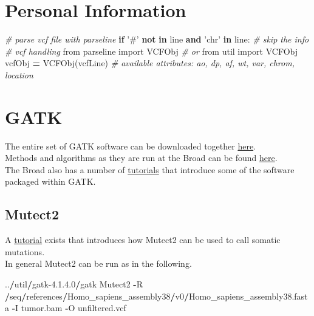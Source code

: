 \documentclass[]{book}
\newenvironment{Shaded}{\begin{snugshade}}{\end{snugshade}}
\newcommand{\CommentTok}[1]{\textcolor[rgb]{0.56,0.35,0.01}{\textit{#1}}}
\newcommand{\ControlFlowTok}[1]{\textcolor[rgb]{0.13,0.29,0.53}{\textbf{#1}}}
\newcommand{\DecValTok}[1]{\textcolor[rgb]{0.00,0.00,0.81}{#1}}
\newcommand{\FloatTok}[1]{\textcolor[rgb]{0.00,0.00,0.81}{#1}}
\newcommand{\ImportTok}[1]{#1}
\newcommand{\KeywordTok}[1]{\textcolor[rgb]{0.13,0.29,0.53}{\textbf{#1}}}
\newcommand{\NormalTok}[1]{#1}
\newcommand{\OperatorTok}[1]{\textcolor[rgb]{0.81,0.36,0.00}{\textbf{#1}}}
\newcommand{\StringTok}[1]{\textcolor[rgb]{0.31,0.60,0.02}{#1}}
\begin{document}
\hypertarget{personal-information}{%
\section{Personal Information}\label{personal-information}}

\begin{Shaded}
\begin{Highlighting}[]
\CommentTok{# parse vcf file with parseline}
\ControlFlowTok{if} \StringTok{'#'} \KeywordTok{not} \KeywordTok{in}\NormalTok{ line }\KeywordTok{and} \StringTok{'chr'} \KeywordTok{in}\NormalTok{ line: }\CommentTok{# skip the info}
\CommentTok{# vcf handling}
\ImportTok{from}\NormalTok{ parseline }\ImportTok{import}\NormalTok{ VCFObj}
\CommentTok{# or}
\ImportTok{from}\NormalTok{ util }\ImportTok{import}\NormalTok{ VCFObj}
\NormalTok{vcfObj }\OperatorTok{=}\NormalTok{ VCFObj(vcfLine)}
\CommentTok{# available attributes: ao, dp, af, wt, var, chrom, location}
\end{Highlighting}
\end{Shaded}

\hypertarget{gatk}{%
\section{GATK}\label{gatk}}

The entire set of GATK software can be downloaded together \href{'https://software.broadinstitute.org/gatk/'}{here}.\\
Methods and algorithms as they are run at the Broad can be found \href{'https://software.broadinstitute.org/gatk/documentation/topic?name=methods'}{here}.\\
The Broad also has a number of \href{'https://software.broadinstitute.org/gatk/documentation/topic?name=tutorials'}{tutorials} that introduce some of the software packaged within GATK.

\hypertarget{mutect2}{%
\subsection{Mutect2}\label{mutect2}}

A \href{'https://software.broadinstitute.org/gatk/documentation/article?id=24057'}{tutorial} exists that introduces how Mutect2 can be used to call somatic mutations.\\
In general Mutect2 can be run as in the following.

\begin{Shaded}
\begin{Highlighting}[]
\NormalTok{..}\OperatorTok{/}\NormalTok{util}\OperatorTok{/}\NormalTok{gatk}\DecValTok{-4}\NormalTok{.}\DecValTok{1}\NormalTok{.}\FloatTok{4.0}\OperatorTok{/}\NormalTok{gatk Mutect2 }\OperatorTok{-}\NormalTok{R }\OperatorTok{/}\NormalTok{seq}\OperatorTok{/}\NormalTok{references}\OperatorTok{/}\NormalTok{Homo_sapiens_assembly38}\OperatorTok{/}\NormalTok{v0}\OperatorTok{/}\NormalTok{Homo_sapiens_assembly38.fasta }\OperatorTok{-}\NormalTok{I tumor.bam }\OperatorTok{-}\NormalTok{O unfiltered.vcf}
\end{Highlighting}
\end{Shaded}
\end{document}
